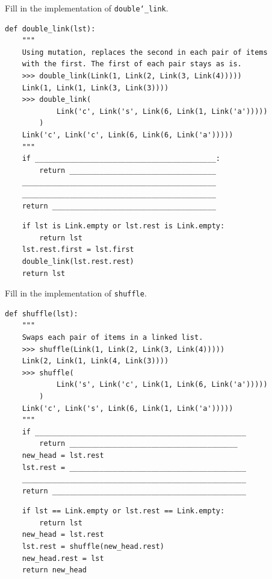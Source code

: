 \documentclass{exam}
\begin{document}
\begin{questions}
\begin{blocksection}
\question Fill in the implementation of \texttt{double\char`_link}.

\begin{lstlisting}
def double_link(lst):
    """
    Using mutation, replaces the second in each pair of items
    with the first. The first of each pair stays as is.
    >>> double_link(Link(1, Link(2, Link(3, Link(4)))))
    Link(1, Link(1, Link(3, Link(3))))
    >>> double_link(
            Link('c', Link('s', Link(6, Link(1, Link('a')))))
        )
    Link('c', Link('c', Link(6, Link(6, Link('a')))))
    """
    if __________________________________________:
        return __________________________________
    _____________________________________________
    _____________________________________________
    return ______________________________________
\end{lstlisting}
\begin{solution}[0.5in]
\begin{lstlisting}
    if lst is Link.empty or lst.rest is Link.empty:
        return lst
    lst.rest.first = lst.first
    double_link(lst.rest.rest)
    return lst
\end{lstlisting}
\end{solution}
\end{blocksection}

\begin{blocksection}
\question Fill in the implementation of \texttt{shuffle}.

\begin{lstlisting}
def shuffle(lst):
    """
    Swaps each pair of items in a linked list.
    >>> shuffle(Link(1, Link(2, Link(3, Link(4)))))
    Link(2, Link(1, Link(4, Link(3))))
    >>> shuffle(
            Link('s', Link('c', Link(1, Link(6, Link('a')))))
        )
    Link('c', Link('s', Link(6, Link(1, Link('a')))))
    """
    if _________________________________________________
        return _______________________________________
    new_head = lst.rest
    lst.rest = _________________________________________
    ____________________________________________________
    return _____________________________________________
\end{lstlisting}

\begin{solution}[0.5in]
\begin{lstlisting}
    if lst == Link.empty or lst.rest == Link.empty:
        return lst
    new_head = lst.rest
    lst.rest = shuffle(new_head.rest)
    new_head.rest = lst
    return new_head
\end{lstlisting}
\end{solution}
\end{blocksection}


\end{questions}
\end{document}
